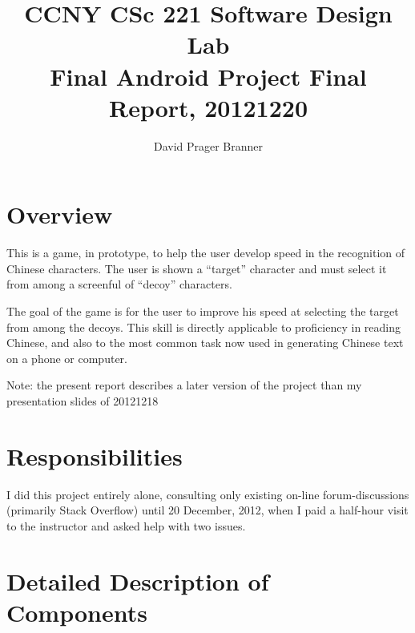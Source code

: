 \documentclass[11pt,asymmetric]{article}
\title{CCNY CSc 221 Software Design Lab\\Final Android Project Final Report, 20121220}
\author{David Prager Branner}
\begin{document}
\maketitle




\section{Overview}
This is a game, in prototype, to help the user develop speed in the recognition of Chinese characters. The user is shown a ``target'' character and must select it from among a screenful of ``decoy'' characters.

The goal of the game is for the user to improve his speed at selecting the target from among the decoys. This skill is directly applicable to proficiency in reading Chinese, and also to the most common task now used in generating Chinese text on a phone or computer.

Note: the present report describes a later version of the project than my presentation slides of 20121218


\section{Responsibilities}
I did this project entirely alone, consulting only existing on-line forum-discussions (primarily Stack Overflow) until 20 December, 2012, when I paid a half-hour visit to the instructor and asked help with two issues.


\section{Detailed Description of Components}
\end{document}
